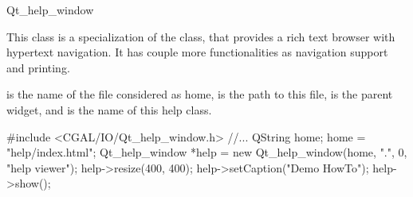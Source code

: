 
\begin{ccRefClass}{Qt_help_window}

\ccDefinition
This class is a specialization of the  class, that
provides a rich text browser with hypertext navigation. It has couple
more functionalities as navigation support and printing.

\ccGlue

\ccInheritsFrom
{}

\ccCreation
{}
{ is the name of the file considered as home,  is 
the path to this file,  is the parent widget, and
 is the name of this help class.}




\ccExample
\begin{ccExampleCode}
  #include <CGAL/IO/Qt_help_window.h>
  //...
  QString home;
  home = "help/index.html";
  Qt_help_window *help = new Qt_help_window(home, ".", 0, "help viewer");
  help->resize(400, 400);
  help->setCaption("Demo HowTo");
  help->show();
\end{ccExampleCode}

\end{ccRefClass}

